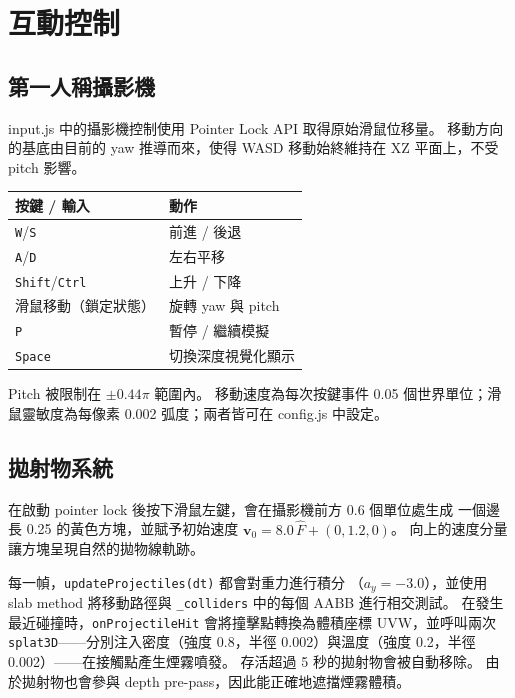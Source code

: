 \documentclass[a4paper, 12pt]{article}
\begin{document}
\section{互動控制}
\label{sec:input}

\subsection{第一人稱攝影機}

input.js 中的攝影機控制使用 Pointer Lock API 取得原始滑鼠位移量。
移動方向的基底由目前的 yaw 推導而來，使得 WASD 移動始終維持在 XZ
平面上，不受 pitch 影響。

\begin{center}
\begin{tabular}{ll}
\toprule
\textbf{按鍵 / 輸入} & \textbf{動作} \\
\midrule
\texttt{W}/\texttt{S}        & 前進 / 後退 \\
\texttt{A}/\texttt{D}        & 左右平移 \\
\texttt{Shift}/\texttt{Ctrl} & 上升 / 下降 \\
滑鼠移動（鎖定狀態）         & 旋轉 yaw 與 pitch \\
\texttt{P}                   & 暫停 / 繼續模擬 \\
\texttt{Space}               & 切換深度視覺化顯示 \\
\bottomrule
\end{tabular}
\end{center}

Pitch 被限制在 $\pm0.44\pi$ 範圍內。
移動速度為每次按鍵事件 0.05 個世界單位；滑鼠靈敏度為每像素
0.002 弧度；兩者皆可在 config.js 中設定。

\subsection{拋射物系統}

在啟動 pointer lock 後按下滑鼠左鍵，會在攝影機前方 0.6 個單位處生成
一個邊長 0.25 的黃色方塊，並賦予初始速度
$\mathbf{v}_0 = 8.0\,\hat{F} + (0,1.2,0)$。
向上的速度分量讓方塊呈現自然的拋物線軌跡。

每一幀，\texttt{updateProjectiles(dt)} 都會對重力進行積分
（$a_y=-3.0$），並使用 slab method 將移動路徑與 \texttt{\_colliders}
中的每個 AABB 進行相交測試。
在發生最近碰撞時，\texttt{onProjectileHit} 會將撞擊點轉換為體積座標
UVW，並呼叫兩次 \texttt{splat3D}——分別注入密度（強度 0.8，半徑
0.002）與溫度（強度 0.2，半徑 0.002）——在接觸點產生煙霧噴發。
存活超過 5 秒的拋射物會被自動移除。
由於拋射物也會參與 depth pre-pass，因此能正確地遮擋煙霧體積。
\end{document}
